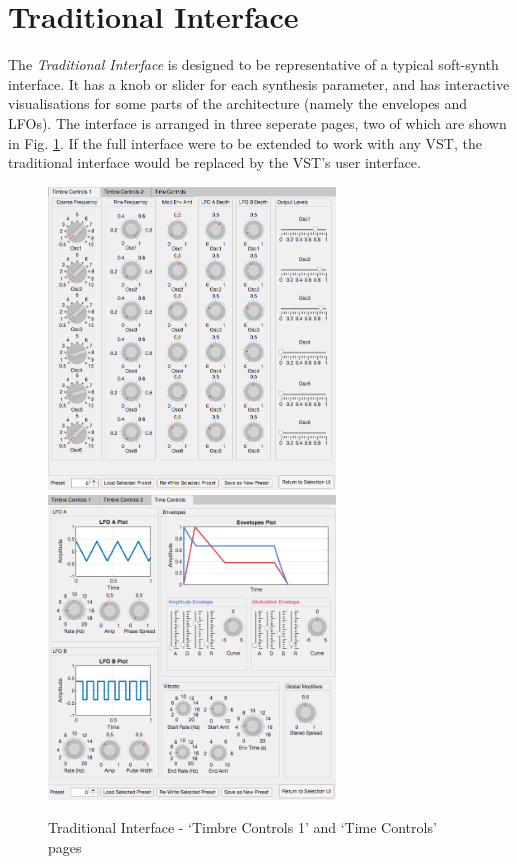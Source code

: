 \documentclass[11pt, oneside]{report}   	%
\begin{document}
\section{Traditional Interface}
The \emph{Traditional Interface} is designed to be representative of a typical soft-synth interface. It has a knob or slider for each synthesis parameter, and has interactive visualisations for some parts of the architecture (namely the envelopes and LFOs). The interface is arranged in three seperate pages, two of which are shown in Fig. \ref{fig:TraditionalInterface}. 
If the full interface were to be extended to work with any VST, the traditional interface would be replaced by the VST's user interface. 
\begin{figure}[h!] 
	\vspace{-5pt}
	\centering
	\hspace*{-0.2cm}
\includegraphics[width = 3in]{TraditionalUI1.png}
\hspace*{0.2cm}
	\includegraphics[width = 3in]{TraditionalUI3.png}
	\caption{Traditional Interface - `Timbre Controls 1' and `Time Controls' pages}
	\label{fig:TraditionalInterface}
	\vspace{-20pt}
\end{figure}
\end{document}
